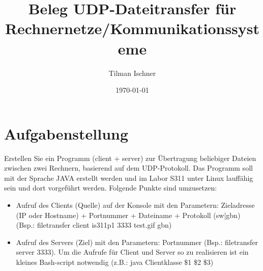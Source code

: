\documentclass{article}
\title{Beleg UDP-Dateitransfer für Rechnernetze/Kommunikationssysteme}
\author{Tilman Ischner}
\date{\today}
\begin{document}
    \maketitle
    \newpage
    \tableofcontents



    \section{Aufgabenstellung}
    Erstellen Sie ein Programm (client + server) zur Übertragung beliebiger Dateien zwischen zwei Rechnern, basierend auf dem UDP-Protokoll. Das Programm soll mit der Sprache JAVA erstellt werden und im Labor S311 unter Linux lauffähig sein und dort vorgeführt werden. Folgende Punkte sind umzusetzen:
    \begin{itemize}
        \item Aufruf des Clients (Quelle) auf der Konsole mit den Parametern: Zieladresse (IP oder Hostname) + Portnummer + Dateiname + Protokoll (sw|gbn) (Bsp.: filetransfer client is311p1 3333 test.gif gbn)
        \item Aufruf des Servers (Ziel) mit den Parametern: Portnummer (Bsp.: filetransfer server 3333). Um die Aufrufe für Client und Server so zu realisieren ist ein kleines Bash-script notwendig (z.B.: java Clientklasse \$1 \$2 \$3)


\end{itemize}
\end{document}
